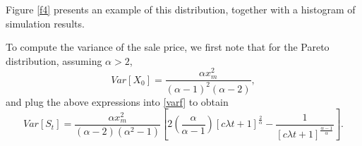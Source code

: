 \documentclass{article}
\numberwithin{equation}{section}
\begin{document}
Figure \ref{f4} presents an 
example of this distribution, together with a histogram of simulation results.

To compute the variance of the sale price, we first note that for the Pareto distribution, assuming $\alpha>2$,
$$Var[X_0]=\frac{\alpha x_m^2}{(\alpha-1)^2(\alpha-2)},$$
and plug the above expressions into
\eqref{varf} to obtain
\begin{equation}\label{var_pareto}Var[S_t]=\frac{\alpha x_m^2}{(\alpha-2)(\alpha^2-1)}\left[
2 \left(\frac{\alpha}{\alpha-1}\right)[ c\lambda  t+1]^{\frac{2}{\alpha}}-\frac{1}{[ c\lambda  t+1]^{\frac{\alpha-1}{\alpha}} } \right].\end{equation}
\end{document}
